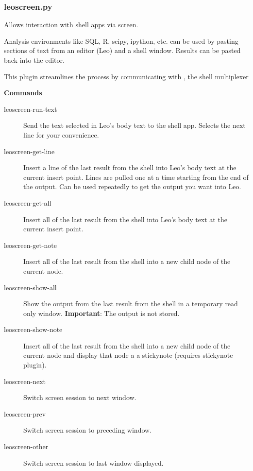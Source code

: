 \documentclass[a4paper,10pt,english]{sphinxmanual}
\begin{document}
\subsubsection{leoscreen.py}
\label{plugins:leoscreen-py}
Allows interaction with shell apps via screen.

Analysis environments like SQL, R, scipy, ipython, etc. can be
used by pasting sections of text from an editor (Leo) and a
shell window.  Results can be pasted back into the editor.

This plugin streamlines the process by communicating with ,
the shell multiplexer

\textbf{Commands}
\begin{description}
\item[{leoscreen-run-text}] \leavevmode
Send the text selected in Leo's body text to the shell app.
Selects the next line for your convenience.

\item[{leoscreen-get-line}] \leavevmode
Insert a line of the last result from the shell into Leo's body text
at the current insert point.  Lines are pulled one at a time starting
from the end of the output.  Can be used repeatedly to get the
output you want into Leo.

\item[{leoscreen-get-all}] \leavevmode
Insert all of the last result from the shell into Leo's body text
at the current insert point.

\item[{leoscreen-get-note}] \leavevmode
Insert all of the last result from the shell into a new child node of
the current node.

\item[{leoscreen-show-all}] \leavevmode
Show the output from the last result from the shell in a temporary
read only window. \textbf{Important}: The output is not stored.

\item[{leoscreen-show-note}] \leavevmode
Insert all of the last result from the shell into a new child node of
the current node and display that node a a stickynote (requires stickynote
plugin).

\item[{leoscreen-next}] \leavevmode
Switch screen session to next window.

\item[{leoscreen-prev}] \leavevmode
Switch screen session to preceding window.

\item[{leoscreen-other}] \leavevmode
Switch screen session to last window displayed.


\end{description}
\end{document}
